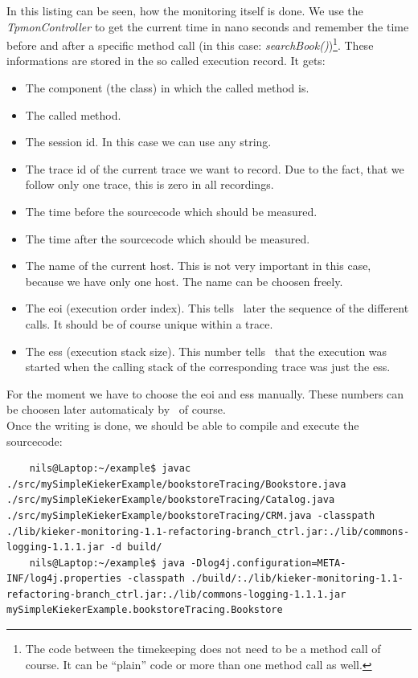 \documentclass[a4paper, oneside, 11pt]{scrartcl}
\begin{document}
      In this listing can be seen, how the monitoring itself is done. We use the \textit{TpmonController} to get the current time in nano seconds and remember the time before and after a specific method call (in this case: \textit{searchBook()})\footnote{The code between the timekeeping does not need to be a method call of course. It can be ``plain'' code or more than one method call as well.}. These informations are stored in the so called execution record. It gets:
      \begin{itemize}
	\item The component (the class) in which the called method is.
	\item The called method.
	\item The session id. In this case we can use any string.
	\item The trace id of the current trace we want to record. Due to the fact, that we follow only one trace, this is zero in all recordings.
	\item The time before the sourcecode which should be measured.
	\item The time after the sourcecode which should be measured.
	\item The name of the current host. This is not very important in this case, because we have only one host. The name can be choosen freely.
	\item The eoi (execution order index). This tells \Kieker\ later the sequence of the different calls. It should be of course unique within a trace.
	\item The ess (execution stack size). This number tells \Kieker\ that the execution was started when the calling stack of the corresponding trace was just the                
              ess.
      \end{itemize}
      For the moment we have to choose the eoi and ess manually. These numbers can be choosen later automaticaly by \Kieker\ of course.\\
      Once the writing is done, we should be able to compile and execute the sourcecode:
      \setBashListing
      \begin{lstlisting}
	nils@Laptop:~/example$ javac ./src/mySimpleKiekerExample/bookstoreTracing/Bookstore.java ./src/mySimpleKiekerExample/bookstoreTracing/Catalog.java ./src/mySimpleKiekerExample/bookstoreTracing/CRM.java -classpath ./lib/kieker-monitoring-1.1-refactoring-branch_ctrl.jar:./lib/commons-logging-1.1.1.jar -d build/
	nils@Laptop:~/example$ java -Dlog4j.configuration=META-INF/log4j.properties -classpath ./build/:./lib/kieker-monitoring-1.1-refactoring-branch_ctrl.jar:./lib/commons-logging-1.1.1.jar mySimpleKiekerExample.bookstoreTracing.Bookstore
      \end{lstlisting}
\end{document}
